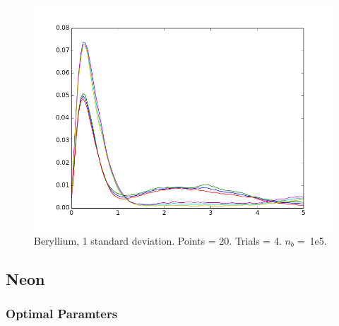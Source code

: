 \documentclass[twocolumn,fleqn,8pt]{article}  %
\begin{document}
\begin{figure}
	\includegraphics[width=\columnwidth]{../res/plot/beryllium_03/beryllium_03.png}
	\caption{Beryllium, 1 standard deviation. 
	Points = 20. Trials = 4.	$n_b = \:$1e5.}
	\label{fig:beyllium_03}
\end{figure}

\subsection{Neon}
\subsubsection{Optimal Paramters}
\end{document}
